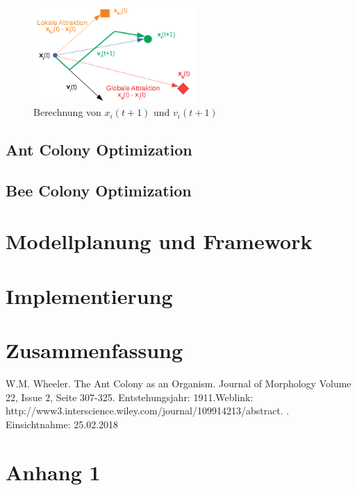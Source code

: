 \documentclass[a4paper, 11pt]{article}
\makeatletter
\newcommand*{\appendixtoc}{%
	\begingroup
	\edef\@alltocdepth{\the\value{tocdepth}}%
	\setcounter{tocdepth}{-10000}%
	\renewcommand*{\contentsname}{%
		Verzeichnis der Anh\"ange}%
	\renewcommand*{\appendixattoc}{%
		\setcounter{tocdepth}{\@alltocdepth}%
	}%
	\tableofcontents%
	\setcounter{tocdepth}{\@alltocdepth}%
	\endgroup
}
\newcommand*{\appendixattoc}{%
}
\makeatother
\begin{document}
\begin{figure}[h]
	\begin{center}
		\includegraphics[width=0.55\textwidth]{pso}
	\end{center}
	\hspace{1in}\parbox{4in}{\caption[Berechnung von $x_{i}(t+1)$ und $v_{i}(t+1)$]{Berechnung von $x_{i}(t+1)$ und $v_{i}(t+1)$}}
	\label{psoabb}
\end{figure}
\subsection{Ant Colony Optimization}

\subsection{Bee Colony Optimization}
\section{Modellplanung und Framework}
\section{Implementierung}
\section{Zusammenfassung}

\newpage
\begin{thebibliography}{sotief}
	W.M. Wheeler. The Ant Colony as an Organism. Journal of Morphology Volume 22, Issue 2, Seite 307-325. Entstehungsjahr: 1911.\newline\newline Weblink:
	http://www3.interscience.wiley.com/journal/109914213/abstract. . Einsichtnahme: 25.02.2018
\end{thebibliography}
\newpage
\appendixtoc
\newpage
\section{Anhang 1} 
\end{document}
